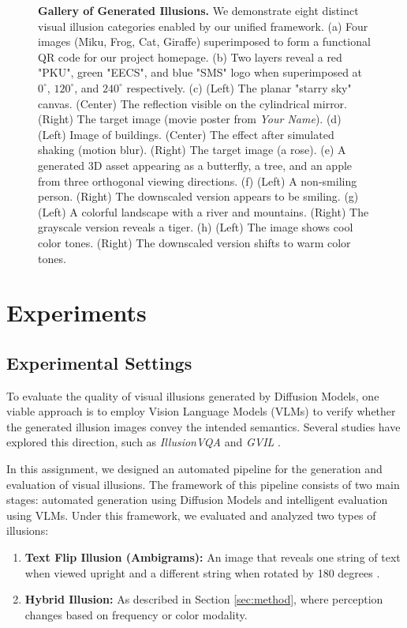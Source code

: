 \documentclass{article}
\begin{document}
\begin{figure}[t]
    \caption{\textbf{Gallery of Generated Illusions.} We demonstrate eight distinct visual illusion categories enabled by our unified framework. 
    (a) Four images (Miku, Frog, Cat, Giraffe) superimposed to form a functional QR code for our project homepage. 
    (b) Two layers reveal a red "PKU", green "EECS", and blue "SMS" logo when superimposed at $0^\circ$, $120^\circ$, and $240^\circ$ respectively. 
    (c) (Left) The planar "starry sky" canvas. (Center) The reflection visible on the cylindrical mirror. (Right) The target image (movie poster from \textit{Your Name}). 
    (d) (Left) Image of buildings. (Center) The effect after simulated shaking (motion blur). (Right) The target image (a rose). 
    (e) A generated 3D asset appearing as a butterfly, a tree, and an apple from three orthogonal viewing directions. 
    (f) (Left) A non-smiling person. (Right) The downscaled version appears to be smiling. 
    (g) (Left) A colorful landscape with a river and mountains. (Right) The grayscale version reveals a tiger. 
    (h) (Left) The image shows cool color tones. (Right) The downscaled version shifts to warm color tones.}
    \label{fig:all_methods}
\end{figure}

\section{Experiments}

\subsection{Experimental Settings}
To evaluate the quality of visual illusions generated by Diffusion Models, one viable approach is to employ Vision Language Models (VLMs) to verify whether the generated illusion images convey the intended semantics. Several studies have explored this direction, such as \emph{IllusionVQA} \cite{shahgir2024illusionvqa} and \emph{GVIL} \cite{zhang2023grounding}.

In this assignment, we designed an automated pipeline for the generation and evaluation of visual illusions. The framework of this pipeline consists of two main stages: automated generation using Diffusion Models and intelligent evaluation using VLMs. Under this framework, we evaluated and analyzed two types of illusions:
\begin{enumerate}
    \item \textbf{Text Flip Illusion (Ambigrams):} An image that reveals one string of text when viewed upright and a different string when rotated by 180 degrees \cite{geng2024visual}.
    \item \textbf{Hybrid Illusion:} As described in Section \ref{sec:method}, where perception changes based on frequency or color modality.
\end{enumerate}
\end{document}
